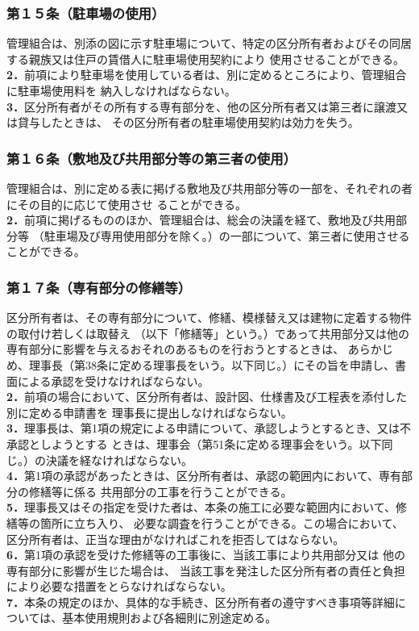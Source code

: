\documentclass[
  luatex,
  paper=a4paper,
  fontsize=11pt,
  jafontsize=10pt,
  jlreq_notes,
]{jlreq}
\begin{document}
  \subsubsection*{第１５条（駐車場の使用）}
  管理組合は、別添の図に示す駐車場について、特定の区分所有者およびその同居する親族又は住戸の賃借人に駐車場使用契約により
  使用させることができる。\\
  \textbf{2．}前項により駐車場を使用している者は、別に定めるところにより、管理組合に駐車場使用料を
  納入しなければならない。\\
  \textbf{3．}区分所有者がその所有する専有部分を、他の区分所有者又は第三者に譲渡又は貸与したときは、
  その区分所有者の駐車場使用契約は効力を失う。
  \subsubsection*{第１６条（敷地及び共用部分等の第三者の使用）}
  管理組合は、別に定める表に掲げる敷地及び共用部分等の一部を、それぞれの者にその目的に応じて使用させ
  ることができる。\\
  \textbf{2．}前項に掲げるもののほか、管理組合は、総会の決議を経て、敷地及び共用部分等
  （駐車場及び専用使用部分を除く。）の一部について、第三者に使用させることができる。
  \subsubsection*{第１７条（専有部分の修繕等）}
  区分所有者は、その専有部分について、修繕、模様替え又は建物に定着する物件の取付け若しくは取替え
  （以下「修繕等」という。）であって共用部分又は他の専有部分に影響を与えるおそれのあるものを行おうとするときは、
  あらかじめ、理事長（第38条に定める理事長をいう。以下同じ。）にその旨を申請し、書面による承認を受けなければならない。\\
  \textbf{2．}前項の場合において、区分所有者は、設計図、仕様書及び工程表を添付した別に定める申請書を
  理事長に提出しなければならない。\\
  \textbf{3．}理事長は、第1項の規定による申請について、承認しようとするとき、又は不承認としようとする
  ときは、理事会（第51条に定める理事会をいう。以下同じ。）の決議を経なければならない。\\
  \textbf{4．}第1項の承認があったときは、区分所有者は、承認の範囲内において、専有部分の修繕等に係る
  共用部分の工事を行うことができる。\\
  \textbf{5．}理事長又はその指定を受けた者は、本条の施工に必要な範囲内において、修繕等の箇所に立ち入り、
  必要な調査を行うことができる。この場合において、区分所有者は、正当な理由がなければこれを拒否してはならない。\\
  \textbf{6．}第1項の承認を受けた修繕等の工事後に、当該工事により共用部分又は 他の専有部分に影響が生じた場合は、
  当該工事を発注した区分所有者の責任と負担により必要な措置をとらなければならない。\\
  \textbf{7．}本条の規定のほか、具体的な手続き、区分所有者の遵守すべき事項等詳細については、基本使用規則および各細則に別途定める。
\end{document}

